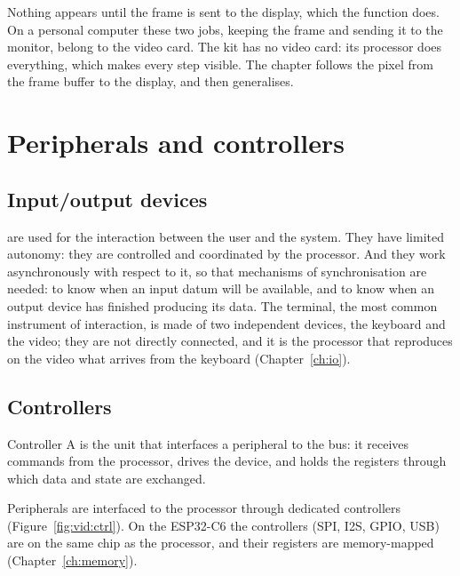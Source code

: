 Nothing appears until the frame is sent to the display, which the function
 does. On a personal computer these two jobs,
keeping the frame and sending it to the monitor, belong to the video card.
The kit has no video card: its processor does everything, which makes every
step visible. The chapter follows the pixel from the frame buffer to the
display, and then generalises.

\section{Peripherals and controllers}

\subsection{Input/output devices}

 are used for the interaction between the user and the
system. They have limited autonomy: they are controlled and coordinated by
the processor. And they work asynchronously with respect to it, so that
mechanisms of synchronisation are needed: to know when an input datum will be
available, and to know when an output device has finished producing its data.
The terminal, the most common instrument of interaction, is made of two
independent devices, the keyboard and the video; they are not directly
connected, and it is the processor that reproduces on the video what arrives
from the keyboard (Chapter~\ref{ch:io}).

\subsection{Controllers}

\begin{definition}{Controller}
A  is the unit that interfaces a peripheral to the bus: it
receives commands from the processor, drives the device, and holds the
registers through which data and state are exchanged.
\end{definition}

Peripherals are interfaced to the processor through dedicated controllers
(Figure~\ref{fig:vid:ctrl}). On the ESP32-C6 the controllers (SPI, I2S, GPIO,
USB) are on the same chip as the processor, and their registers are
memory-mapped (Chapter~\ref{ch:memory}).

